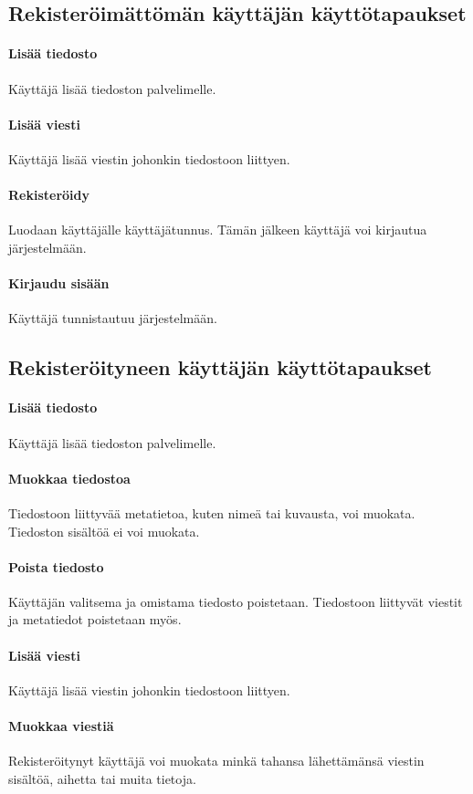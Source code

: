 \documentclass[10pt,a4paper]{article}
\begin{document}
\subsection{Rekisteröimättömän käyttäjän käyttötapaukset}
\paragraph{Lisää tiedosto}
Käyttäjä lisää tiedoston palvelimelle.
\paragraph{Lisää viesti}
Käyttäjä lisää viestin johonkin tiedostoon liittyen.

\paragraph{Rekisteröidy}
Luodaan käyttäjälle käyttäjätunnus. Tämän jälkeen käyttäjä voi kirjautua järjestelmään.
\paragraph{Kirjaudu sisään}
Käyttäjä tunnistautuu järjestelmään.


\subsection{Rekisteröityneen käyttäjän käyttötapaukset}
\paragraph{Lisää tiedosto}
Käyttäjä lisää tiedoston palvelimelle.
\paragraph{Muokkaa tiedostoa}
Tiedostoon liittyvää metatietoa, kuten nimeä tai kuvausta, voi muokata. Tiedoston sisältöä ei voi muokata.
\paragraph{Poista tiedosto}
Käyttäjän valitsema ja omistama tiedosto poistetaan. Tiedostoon liittyvät viestit ja metatiedot poistetaan myös.

\paragraph{Lisää viesti}
Käyttäjä lisää viestin johonkin tiedostoon liittyen.
\paragraph{Muokkaa viestiä}
Rekisteröitynyt käyttäjä voi muokata minkä tahansa lähettämänsä viestin sisältöä, aihetta tai muita tietoja.
\end{document}

